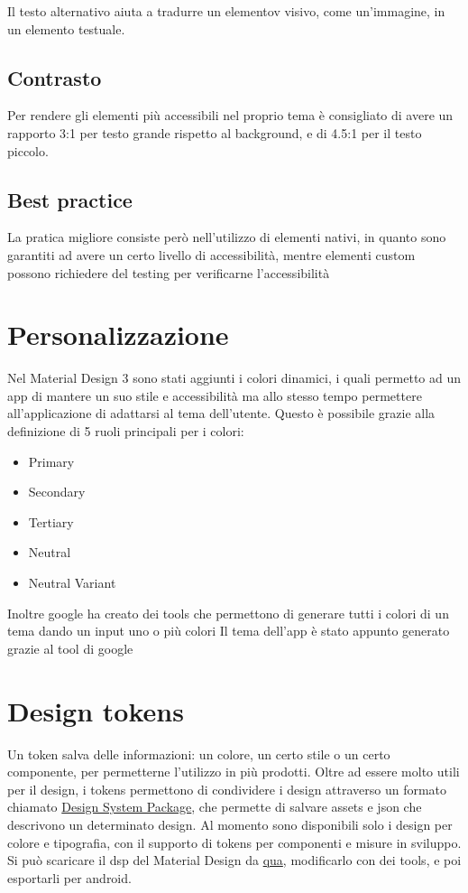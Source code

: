 \documentclass[12pt, a4paper]{report}
\begin{document}
			Il testo alternativo aiuta a tradurre un elementov visivo, come un'immagine, in un elemento testuale.
		\subsection{Contrasto}
			Per rendere gli elementi più accessibili nel proprio tema è consigliato di avere un rapporto 3:1 per testo grande rispetto al background, e di 4.5:1 per il testo piccolo.

		\subsection{Best practice}
			La pratica migliore consiste però nell'utilizzo di elementi nativi, in quanto sono garantiti ad avere un certo livello di accessibilità, mentre elementi custom possono richiedere del testing per verificarne l'accessibilità
	\section{Personalizzazione}
		Nel Material Design 3 sono stati aggiunti i colori dinamici, i quali permetto ad un app di mantere un suo stile e accessibilità ma allo stesso tempo permettere all'applicazione di adattarsi al tema dell'utente.
		Questo è possibile grazie alla definizione di 5 ruoli principali per i colori:
		\begin{itemize}
			\item Primary
			\item Secondary
			\item Tertiary
			\item Neutral
			\item Neutral Variant
		\end{itemize}
		Inoltre google ha creato dei tools che permettono di generare tutti i colori di un tema dando un input uno o più colori
		Il tema dell'app è stato appunto generato grazie al tool di google
		
	\section{Design tokens}
		Un token salva delle informazioni: un colore, un certo stile o un certo componente, per permetterne l'utilizzo in più prodotti.
		Oltre ad essere molto utili per il design, i tokens permettono di condividere i design attraverso un formato chiamato \href{https://github.com/AdobeXD/design-system-package-dsp}{Design System Package},
		che permette di salvare assets e json che descrivono un determinato design.
		Al momento sono disponibili solo i design per colore e tipografia, con il supporto di tokens per componenti e misure in sviluppo. Si può scaricare il dsp del Material Design da \href{https://github.com/material-foundation/material-tokens}{qua}, modificarlo con dei tools, e poi esportarli per android.
		
\end{document}
